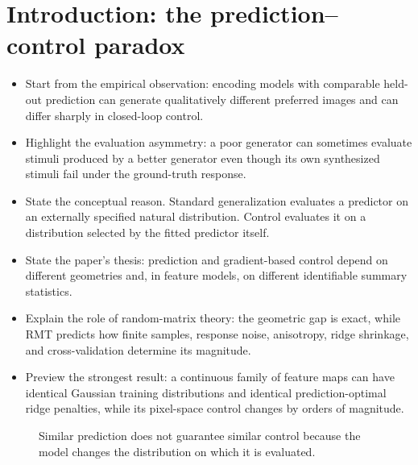 \documentclass[11pt]{article}
\begin{document}
\section{Introduction: the prediction--control paradox}
\label{sec:introduction}

\begin{itemize}
  \item Start from the empirical observation: encoding models with comparable
        held-out prediction can generate qualitatively different preferred
        images and can differ sharply in closed-loop control.
  \item Highlight the evaluation asymmetry: a poor generator can sometimes
        evaluate stimuli produced by a better generator even though its own
        synthesized stimuli fail under the ground-truth response.
  \item State the conceptual reason. Standard generalization evaluates a
        predictor on an externally specified natural distribution. Control
        evaluates it on a distribution selected by the fitted predictor
        itself.
  \item State the paper's thesis: prediction and gradient-based control depend
        on different geometries and, in feature models, on different
        identifiable summary statistics.
  \item Explain the role of random-matrix theory: the geometric gap is exact,
        while RMT predicts how finite samples, response noise, anisotropy,
        ridge shrinkage, and cross-validation determine its magnitude.
  \item Preview the strongest result: a continuous family of feature maps can
        have identical Gaussian training distributions and identical
        prediction-optimal ridge penalties, while its pixel-space control
        changes by orders of magnitude.
\end{itemize}

\begin{figure}[t]
  \centering
  \caption{Similar prediction does not guarantee similar control because the
  model changes the distribution on which it is evaluated.}
  \label{fig:empirical-paradox}
\end{figure}
\end{document}
